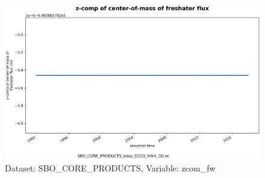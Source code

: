 \begin{figure}[H]
\centering
\includegraphics[scale=0.55]{../images/plots/oneD_plots/SBO_Core_Products/zcom_fw.png}
\caption{Dataset: SBO\_CORE\_PRODUCTS, Variable: zcom\_fw}
\label{tab:table-SBO_CORE_PRODUCTS_zcom_fw-Plot}
\end{figure}
\newpage
\pagebreak
